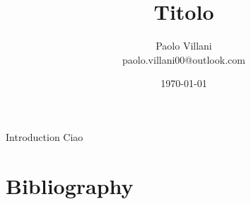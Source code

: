 \documentclass[10pt, a4paper, twoside]{article}
\begin{document}
\title{Titolo}
\author{Paolo Villani\\paolo.villani00@outlook.com}
\date{\today}
\maketitle
\begin{abstractBox}[colbacktitle=black]{Introduction}{
Ciao
}
\end{abstractBox}

\vspace{.5cm}
\pagestyle{fancy}
\pagestyle{fancyfront}

\pagestyle{fancymain}
\tableofcontents

\newpage

\newpage

\newpage

\newpage




\newpage
\pagestyle{fancyapp}
\appendix


\newpage
\pagestyle{fancybib}
\section*{Bibliography}

\renewcommand\refname{}


\end{document}
